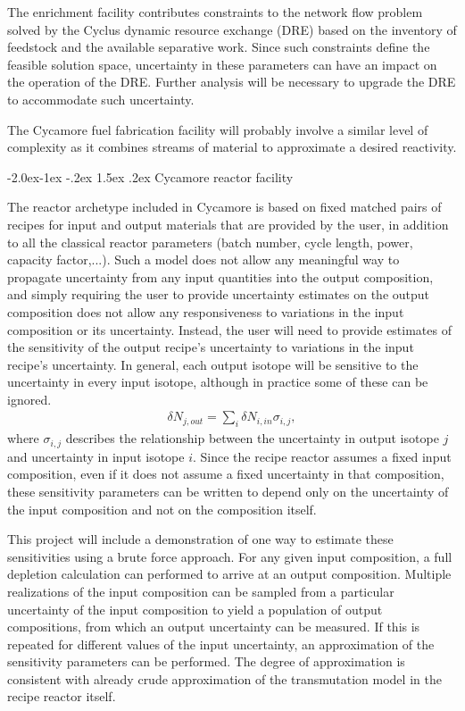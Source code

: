 \documentclass[dvips,11pt]{article}
\makeatletter
\newcommand{\unc}[1]
{ \delta #1 }
\renewcommand\subsubsection{\@startsection{subsubsection}{3}{\z@}%
                                     {-2.0ex\@plus -1ex \@minus -.2ex}%
                                     {1.5ex \@plus .2ex}%
                                     {\normalfont\bfseries}}%
\makeatother
\begin{document}
The enrichment facility contributes constraints to
the network flow problem solved by the Cyclus
dynamic resource exchange (DRE) based on the
inventory of feedstock and the available
separative work.  Since such constraints define
the feasible solution space, uncertainty in these
parameters can have an impact on the operation of
the DRE.  Further analysis will be necessary to
upgrade the DRE to accommodate such uncertainty.

The Cycamore fuel fabrication facility will
probably involve a similar level of complexity as
it combines streams of material to approximate a
desired reactivity.

\subsubsection{Cycamore reactor facility}

The reactor archetype included in Cycamore is
based on fixed matched pairs of recipes for input
and output materials that are provided by the
user, in addition to all the classical reactor
parameters (batch number, cycle length, power,
capacity factor,...).  Such a model does not allow
any meaningful way to propagate uncertainty from
any input quantities into the output composition,
and simply requiring the user to provide uncertainty 
estimates on the output composition does not allow
any responsiveness to variations in the input
composition or its uncertainty.
Instead, the user will need to provide estimates
of the sensitivity of the output recipe's uncertainty to
variations in the input recipe's uncertainty.  In
general, each output isotope will be sensitive to
the uncertainty in every input isotope, although
in practice some of these can be ignored.
\begin{align}
\unc{N_{j,out}} = \sum_i \unc{N_{i,in}} \sigma_{i,j},
\end{align}
where $\sigma_{i,j}$ describes the relationship
between the uncertainty in output isotope $j$ and
uncertainty in input isotope $i$.  Since the
recipe reactor assumes a fixed input composition,
even if it does not assume a fixed uncertainty in
that composition, these sensitivity parameters can
be written to depend only on the uncertainty of
the input composition and not on the composition
itself.  

This project will include a demonstration of one
way to estimate these sensitivities using a brute
force approach.  For any given input composition,
a full depletion calculation can performed to
arrive at an output composition.  Multiple
realizations of the input composition can be
sampled from a particular uncertainty of the input
composition to yield a population of output
compositions, from which an output uncertainty can
be measured.  If this is repeated for different
values of the input uncertainty, an approximation
of the sensitivity parameters can be performed.
The degree of approximation is consistent with
already crude approximation of the transmutation
model in the recipe reactor itself.
\end{document}
